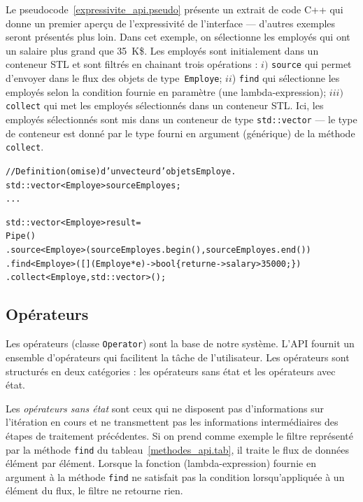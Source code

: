 Le pseudocode~\ref{expressivite_api.pseudo} pr\'esente un extrait de code C++ qui donne un premier aper\c{c}u de l'expressivit\'e de l'interface --- d'autres exemples seront pr\'esent\'es plus loin. Dans cet exemple, on s\'electionne les employ\'es qui ont un salaire plus grand que 35~K\$. Les employ\'es sont initialement dans un conteneur STL et sont filtr\'es en chainant trois op\'erations : $i)$ \texttt{source} qui permet d'envoyer dans le flux des objets de type~\texttt{Employe}; $ii$) \texttt{find} qui s\'electionne les employ\'es selon la condition fournie en param\`etre (une lambda-expression); $iii)$ \texttt{collect} qui met les employ\'es s\'electionn\'es dans un conteneur STL. Ici, les employ\'es s\'electionn\'es sont mis dans un conteneur de type \texttt{std::vector} --- le type de conteneur est donn\'e par le type fourni en argument (g\'en\'erique) de la m\'ethode \texttt{collect}.


\begin{pseudocode}
{\small
\begin{alltt}
// Definition (omise) d'un vecteur d'objets Employe.
std::vector<Employe> sourceEmployes;
...

std::vector<Employe> result = 
        Pipe()
        .source<Employe>(sourceEmployes.begin(), sourceEmployes.end())
        .find<Employe>([](Employe *e) -> bool \{ return e->salary > 35000; \})
        .collect<Employe, std::vector>();

\end{alltt}
}
\caption{Un exemple illustrant l'\'expressivit\'e de l'API de \ppff.}
\label{expressivite_api.pseudo}
\end{pseudocode}




\subsection{Op\'erateurs}

Les op\'erateurs (classe \texttt{Operator}) sont la base de notre syst\`eme. L'API fournit un ensemble d'op\'erateurs qui facilitent la t\^ache de l'utilisateur. Les op\'erateurs sont structur\'es en deux cat\'egories : les op\'erateurs sans \'etat et les op\'erateurs avec \'etat.

Les \emph{op\'erateurs sans \'etat} sont ceux qui ne disposent pas d'informations sur l'it\'eration en cours et ne transmettent pas les informations interm\'ediaires des \'etapes de traitement pr\'ec\'edentes. Si on prend comme exemple le filtre repr\'esent\'e par la m\'ethode \texttt{find} du tableau~\ref{methodes_api.tab}, il traite le flux de donn\'ees \'el\'ement par \'el\'ement. 
%
Lorsque la fonction (lambda-expression) fournie en argument \`a la m\'ethode \texttt{find} ne satisfait pas la condition lorsqu'appliqu\'ee \`a un \'el\'ement du flux, le filtre ne retourne rien. 

